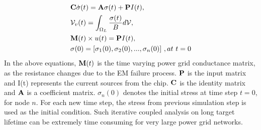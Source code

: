 \begin{align}
	\label{eq:em}
	\begin{split}
		&{\bf C} \dot{\sigma}(t)  = {\bf A} \sigma(t) + {\bf P}I(t),  \\
		&\mathcal{V}_v(t)  = \int_{\Omega_L}\frac{\sigma(t)}{B}d\mathcal{V},  \\ 
		&{\bf M}(t) \times u(t)  = {\bf P} I(t), \\
		&{\bf \sigma}(0)  = [\sigma_1(0), \sigma_2(0), ..., \sigma_n(0)] \,\, ,at \,\, t = 0 
	\end{split}
\end{align}
In the above equations, ${\bf M}(t)$ is the time varying power grid conductance matrix, as the resistance changes due to the EM failure process. ${{\bf P}}$ is the input matrix and I(t) represents the current sources from the chip. ${{\bf C}}$ is the identity matrix and ${{\bf A}}$ is a coefficient matrix. $\sigma_{n}(0)$ denotes the initial stress at time step $t = 0$, for node $n$. For each new time step, the stress from previous simulation step is used as the initial condition. Such iterative coupled analysis on long target lifetime can be extremely time consuming for very large power grid networks.

